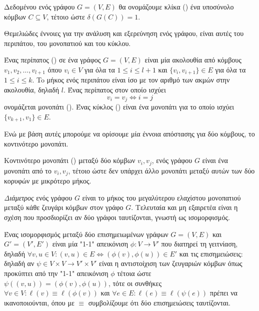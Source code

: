 \begin{definition}[Κλίκα]
Δεδομένου ενός γράφου $G = (V, E)$ θα ονομάζουμε κλίκα () ένα υποσύνολο κόμβων $C \subseteq V$, τέτοιο ώστε $\delta(G(C)) = 1$.
\end{definition}
Θεμελιώδες έννοιες για την ανάλυση και εξερεύνηση ενός γράφου, είναι αυτές του περιπάτου, του μονοπατιού και του κύκλου.
\begin{definition}
Ένας περίπατος () σε ένα γράφος $G = (V, E)$ είναι μία ακολουθία από κόμβους $v_{1}, v_{2}, \dots , v_{l + 1}$ όπου $v_{i} \in V$ για όλα τα $1 \leq i \leq l + 1$ και $\{ v_{i} , v_{i + 1} \} \in E$ για όλα τα
$1 \leq i \leq k$.
To μήκος ενός περιπάτου είναι ίσο με τον αριθμό των ακμών στην ακολουθία, δηλαδή $l$.
Ένας περίπατος στον οποίο ισχύει $$v_{i} = v_{j} \Leftrightarrow i = j$$ ονομάζεται μονοπάτι ().
Ένας κύκλος () είναι ένα μονοπάτι για το οποίο ισχύει $\{v_{k + 1}, v_{1}\} \in E$.
\label{def:path}
\end{definition}
Ενώ με βάση αυτές μπορούμε να ορίσουμε μία έννοια απόστασης για δύο κόμβους, το κοντινότερο μονοπάτι.
\begin{definition}
Κοντινότερο μονοπάτι () μεταξύ δύο κόμβων $v_{i}, v_{j}$, ενός γράφου $G$ είναι ένα μονοπάτι από
το $v_{i}, v_{j}$, τέτοιο ώστε δεν υπάρχει άλλο μονοπάτι μεταξύ αυτών των δύο κορυφών με μικρότερο μήκος.
\end{definition}
\textit{Διάμετρος} ενός γράφου $G$ είναι το μήκος του μεγαλύτερου ελαχίστου μονοπατιού μεταξύ κάθε ζευγάρι κόμβων στον γράφο $G$.
Τελευταία και μη εξαιρετέα είναι η σχέση που προσδιορίζει αν δύο γράφοι ταυτίζονται, γνωστή ως ισομορφισμός.
\begin{definition}[Ισομορφισμός]
Ένας ισομορφισμός μεταξύ δύο επισημειωμένων γράφων $G=(V,E)$ και $G'=(V',E')$ είναι μία "1-1" απεικόνιση $\phi : V \rightarrow V'$ που διατηρεί τη γειτνίαση, δηλαδή $\forall v,u \in V : (v,u) \in E \Leftrightarrow (\phi(v), \phi(u)) \in E'$ και τις επισημειώσεις: δηλαδή αν $\psi \in V \times V \rightarrow V' \times V'$ είναι η αντιστοίχιση των ζευγαριών κόμβων όπως προκύπτει από την "1-1" απεικόνιση $\phi$ τέτοια ώστε $\psi((v,u)) = (\phi(v), \phi(u))$, τότε οι συνθήκες $\forall v \in V : \ell(v) \equiv \ell(\phi(v))$ και $\forall e \in E : \ell(e) \equiv \ell(\psi(e))$ πρέπει να ικανοποιούνται, όπου με $\equiv$ συμβολίζουμε ότι δύο επισημειώσεις ταυτίζονται.
\label{def:isomorphism}
\end{definition}

